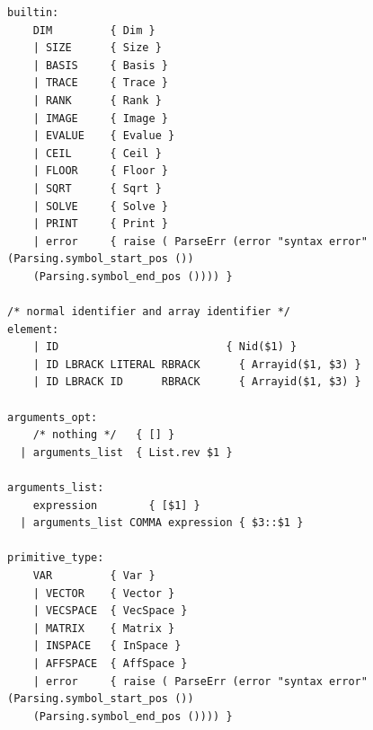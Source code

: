 \documentclass[12pt]{article} %
\begin{document}
\begin{lstlisting}[style=appendix, caption=parser.mly]
builtin:
    DIM         { Dim }
    | SIZE      { Size }
    | BASIS     { Basis }
    | TRACE     { Trace }
    | RANK      { Rank }
    | IMAGE     { Image }
    | EVALUE    { Evalue }
    | CEIL      { Ceil }
    | FLOOR     { Floor }
    | SQRT      { Sqrt }
    | SOLVE     { Solve }
    | PRINT     { Print }
    | error     { raise ( ParseErr (error "syntax error" (Parsing.symbol_start_pos ()) 
    (Parsing.symbol_end_pos ()))) }

/* normal identifier and array identifier */
element:
    | ID                          { Nid($1) }
    | ID LBRACK LITERAL RBRACK      { Arrayid($1, $3) }
    | ID LBRACK ID      RBRACK      { Arrayid($1, $3) }

arguments_opt:
    /* nothing */   { [] }
  | arguments_list  { List.rev $1 }

arguments_list:
    expression        { [$1] }       
  | arguments_list COMMA expression { $3::$1 } 

primitive_type:
    VAR         { Var }
    | VECTOR    { Vector }
    | VECSPACE  { VecSpace }
    | MATRIX    { Matrix }
    | INSPACE   { InSpace }
    | AFFSPACE  { AffSpace }
    | error     { raise ( ParseErr (error "syntax error" (Parsing.symbol_start_pos ()) 
    (Parsing.symbol_end_pos ()))) }
\end{lstlisting}
\end{document}
